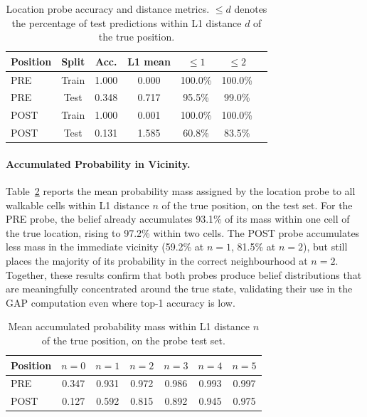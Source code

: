 \documentclass[final]{sparreport}
\begin{document}
\begin{table}[h]
\centering
\begin{tabular}{lcccccc}
\toprule
\textbf{Position} & \textbf{Split} & \textbf{Acc.} & \textbf{L1 mean}  & $\leq 1$ & $\leq 2$ \\
\midrule
PRE  & Train & 1.000 & 0.000& 100.0\% & 100.0\% \\
PRE  & Test  & 0.348 & 0.717  &  95.5\% &  99.0\% \\
POST & Train & 1.000 & 0.001& 100.0\% & 100.0\% \\
POST & Test  & 0.131 & 1.585 &  60.8\% &  83.5\% \\
\bottomrule
\end{tabular}
\caption{Location probe accuracy and distance metrics. $\leq d$ denotes the 
percentage of test predictions within L1 distance $d$ of the true position.}
\label{tab:loc_probe_acc}
\end{table}

\paragraph{Accumulated Probability in Vicinity.}
Table~\ref{tab:vicinity_prob} reports the mean probability mass assigned by the 
location probe to all walkable cells within L1 distance $n$ of the true position, 
on the test set. For the PRE probe, the belief already accumulates 93.1\% of its 
mass within one cell of the true location, rising to 97.2\% within two cells. 
The POST probe accumulates less mass in the immediate vicinity (59.2\% at $n=1$, 
81.5\% at $n=2$), but still places the majority of its probability in the correct 
neighbourhood at $n=2$. Together, these results confirm that both probes produce 
belief distributions that are meaningfully concentrated around the true state, 
validating their use in the GAP computation even where top-1 accuracy is low.

\begin{table}[h]
\centering
\begin{tabular}{lcccccc}
\toprule
\textbf{Position} & $n=0$ & $n=1$ & $n=2$ & $n=3$ & $n=4$ & $n=5$ \\
\midrule
PRE  & 0.347 & 0.931 & 0.972 & 0.986 & 0.993 & 0.997 \\
POST & 0.127 & 0.592 & 0.815 & 0.892 & 0.945 & 0.975 \\
\bottomrule
\end{tabular}
\caption{Mean accumulated probability mass within L1 distance $n$ of the true 
position, on the probe test set.}
\label{tab:vicinity_prob}
\end{table}
\end{document}
